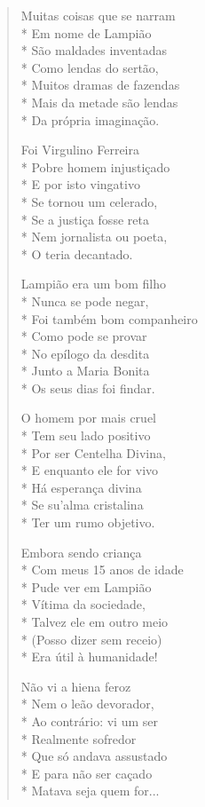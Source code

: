 \begin{verse}
Muitas coisas que se narram\\*
Em nome de Lampião\\*
São maldades inventadas\\*
Como lendas do sertão,\\*
Muitos dramas de fazendas\\*
Mais da metade são lendas\\*
Da própria imaginação.

Foi Virgulino Ferreira\\*
Pobre homem injustiçado\\*
E por isto vingativo\\*
Se tornou um celerado,\\*
Se a justiça fosse reta\\*
Nem jornalista ou poeta,\\*
O teria decantado.

Lampião era um bom filho\\*
Nunca se pode negar,\\*
Foi também bom companheiro\\*
Como pode se provar\\*
No epílogo da desdita\\*
Junto a Maria Bonita\\*
Os seus dias foi findar.

O homem por mais cruel\\*
Tem seu lado positivo\\*
Por ser Centelha Divina,\\*
E enquanto ele for vivo\\*
Há esperança divina\\*
Se su'alma cristalina\\*
Ter um rumo objetivo.

Embora sendo criança\\*
Com meus 15 anos de idade\\*
Pude ver em Lampião\\*
Vítima da sociedade,\\*
Talvez ele em outro meio\\*
(Posso dizer sem receio)\\*
Era útil à humanidade!

Não vi a hiena feroz\\*
Nem o leão devorador,\\*
Ao contrário: vi um ser\\*
Realmente sofredor\\*
Que só andava assustado\\*
E para não ser caçado\\*
Matava seja quem for...


\end{verse}
